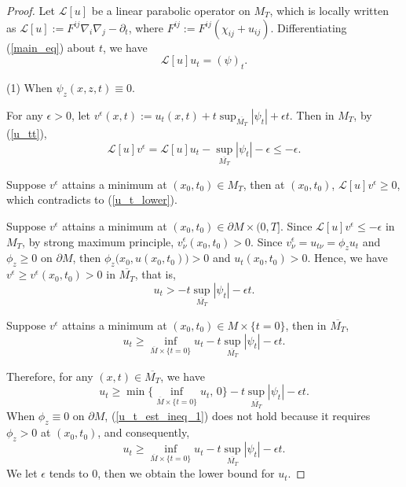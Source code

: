 \documentclass[12pt]{amsart}
\theoremstyle{definition}
\theoremstyle{remark}
\numberwithin{equation}{section}
\begin{document}
\begin{proof}
	Let $\mathcal{L}[u]$ be a linear parabolic operator on $M_T$, which is locally written as $\mathcal{L}[u] := F^{ij}\nabla_{i}\nabla_j - \partial_t$, where $F^{ij} := F^{ij}(\chi_{ij} + u_{ij})$.
	Differentiating (\ref{main_eq}) about $t$, we have
	\begin{equation}\label{u_tt}
	\mathcal{L}[u] u_t = (\psi)_t.
	\end{equation}
	
	(1) When $\psi_z (x, z, t) \equiv 0$.
	
	For any $\epsilon > 0$, let $v^\epsilon (x,t):= u_t(x,t) + t\sup_{\overline{M_T}}|\psi_t| + \epsilon t$. Then in $M_T$, by (\ref{u_tt}),
	\begin{equation}\label{u_t_lower}
	\mathcal{L}[u] v^\epsilon = \mathcal{L}[u] u_t - \sup_{\overline{M_T}}|\psi_t| -\epsilon \leq - \epsilon.
	\end{equation}
	
	
	Suppose $v^\epsilon$ attains a minimum at $(x_0, t_0) \in M_T$, then at $(x_0, t_0)$, $\mathcal{L}[u] v^\epsilon \geq 0$, which contradicts to (\ref{u_t_lower}).
	
	Suppose $v^\epsilon$ attains a minimum at $(x_0, t_0) \in \partial M\times (0,T]$. Since $\mathcal{L}[u] v^\epsilon \leq -\epsilon$ in $M_T$, by strong maximum principle, $v^\epsilon_\nu(x_0, t_0) > 0$. 
	Since $ v_\nu^\epsilon =  u_{t\nu} = \phi_z u_t$ and $\phi_z \geq 0$ on $\partial M$, then $\phi_z \big(x_0, u(x_0, t_0)\big) > 0$ and $u_t(x_0, t_0) > 0$. Hence, we have $v^\epsilon \geq v^\epsilon(x_0, t_0) > 0$ in $\overline{M_T}$, that is, 
	\begin{equation}\label{u_t_est_ineq_1}
	u_t > - t \sup_{\overline{M_T}}|\psi_t| - \epsilon t.
	\end{equation}
	
	Suppose $v^\epsilon$ attains a minimum at $(x_0, t_0) \in M\times \{t = 0\}$, then in $\overline{M_T}$,
	\begin{equation}\label{u_t_est_ineq_2}
	u_t \geq \inf_{\overline{M}\times \{t=0\}} u_t - t\sup_{\overline{M_T}} |\psi_t| - \epsilon t.
	\end{equation}
	
	Therefore, for any $(x, t) \in \overline{M_T}$, we have
	\begin{equation}
	u_t \geq \min\Big\{\inf_{\overline{M}\times \{t=0\}} u_t,\, 0\Big\} - t\sup_{\overline{M_T}} |\psi_t| - \epsilon t.
	\end{equation}
	When $\phi_z \equiv 0$ on $\partial M$, (\ref{u_t_est_ineq_1}) does not hold because it requires $\phi_z > 0$ at $(x_0, t_0)$, and consequently, 
	\begin{equation}
	u_t \geq \inf_{\overline{M}\times \{t=0\}} u_t - t\sup_{\overline{M_T}} |\psi_t| - \epsilon t.
	\end{equation}
	We let $\epsilon$ tends to 0, then we obtain the lower bound for $u_t$.
	

\end{proof}
\end{document}
